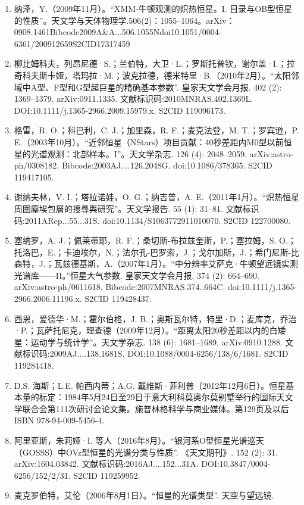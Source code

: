\begin{enumerate}
\item 纳泽，Y.（2009年11月）。“XMM-牛顿观测的炽热恒星。I. 目录与OB型恒星的性质”。天文学与天体物理学.506(2)：1055–1064。arXiv：0908.1461Bibcode2009A&A...506.1055Ndoi10.1051/0004-6361/200912659S2CID17317459
\item 柳比姆科夫，列昂尼德·S.；兰伯特，大卫·L.；罗斯托普钦，谢尔盖·I.；拉奇科夫斯卡娅，塔玛拉·M.；波克拉德，德米特里·B.（2010年2月）。“太阳邻域中A型、F型和G型超巨星的精确基本参数”. 皇家天文学会月报. 402 (2): 1369–1379. arXiv:0911.1335. 文献标识码:2010MNRAS.402.1369L. DOI:10.1111/j.1365-2966.2009.15979.x. S2CID 119096173.
\item 格雷，R. O.；科巴利，C. J.；加里森，R. F.；麦克法登，M. T.；罗宾逊，P. E.（2003年10月）。“近邻恒星（NStars）项目贡献：40秒差距内M0型以前恒星的光谱观测：北部样本。I”。天文学杂志. 126 (4): 2048–2059. arXiv:astro-ph/0308182. Bibcode:2003AJ....126.2048G. doi:10.1086/378365. S2CID 119417105.
\item 谢纳夫林，V. I.；塔拉诺娃，O. G.；纳吉普，A. E.（2011年1月）。“炽热恒星周圍塵埃包層的搜尋與研究”。天文学报告. 55 (1): 31–81. 文献标识码:2011ARep...55...31S. doi:10.1134/S1063772911010070. S2CID 122700080.
\item 塞纳罗，A. J.；佩莱蒂耶，R. F.；桑切斯-布拉兹奎斯，P.；塞拉姆，S. O.；托洛巴，E.；卡迪埃尔，N.；法尔孔-巴罗索，J.；戈尔加斯，J.；希门尼斯-比森特，J.；瓦兹德基斯，A.（2007年1月）。“中分辨率艾萨克·牛顿望远镜实测光谱库——II。”恒星大气参数. 皇家天文学会月报. 374 (2): 664–690. arXiv:astro-ph/0611618. Bibcode:2007MNRAS.374..664C. doi:10.1111/j.1365-2966.2006.11196.x. S2CID 119428437.
\item 西恩，爱德华·M.；霍尔伯格，J. B.；奥斯瓦尔特，特里·D.；麦库克，乔治·P.；瓦萨托尼克，理查德（2009年12月）。“距离太阳20秒差距以内的白矮星：运动学与统计学”。天文学杂志. 138 (6): 1681–1689. arXiv:0910.1288. 文献标识码:2009AJ....138.1681S. DOI:10.1088/0004-6256/138/6/1681. S2CID 119284418.
\item D.S. 海斯；L.E. 帕西内蒂；A.G. 戴维斯·菲利普（2012年12月6日）。恒星基本量的标定：1984年5月24日至29日于意大利科莫奥尔莫别墅举行的国际天文学联合会第111次研讨会论文集。施普林格科学与商业媒体。第129页及以后ISBN 978-94-009-5456-4.
\item 阿里亚斯，朱莉娅·I. 等人（2016年8月）。“银河系O型恒星光谱巡天（GOSSS）中OVz型恒星的光谱分类与性质”. 《天文期刊》. 152 (2): 31. arXiv:1604.03842. 文献标识码:2016AJ....152...31A. DOI:10.3847/0004-6256/152/2/31. S2CID 119259952.
\item 麦克罗伯特，艾伦（2006年8月1日）。“恒星的光谱类型”. 天空与望远镜.

\end{enumerate}
